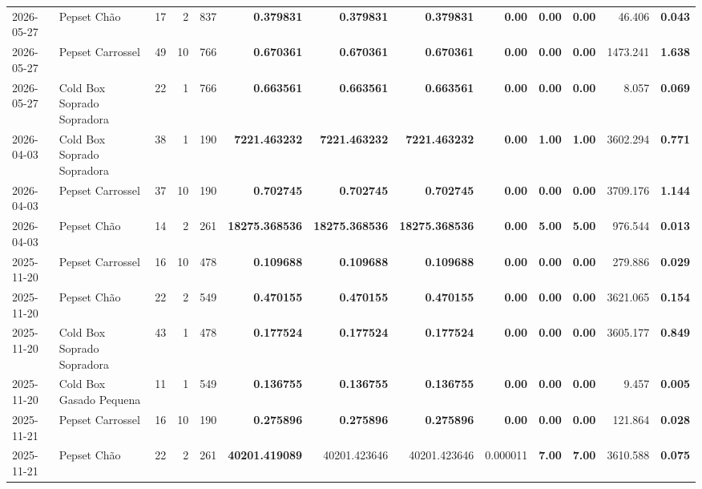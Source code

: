 {\begin{center}
{\begin{tabular}{@{}llrrrrrrrrrrr@{}}
2026-05-27 & Pepset Chão & 17 & 2 & 837 & \textbf{0.379831} & \textbf{0.379831} & \textbf{0.379831} & \textbf{0.00} & \textbf{0.00} & \textbf{0.00} & 46.406 & \textbf{0.043} \\
2026-05-27 & Pepset Carrossel & 49 & 10 & 766 & \textbf{0.670361} & \textbf{0.670361} & \textbf{0.670361} & \textbf{0.00} & \textbf{0.00} & \textbf{0.00} & 1473.241 & \textbf{1.638} \\
2026-05-27 & Cold Box Soprado Sopradora & 22 & 1 & 766 & \textbf{0.663561} & \textbf{0.663561} & \textbf{0.663561} & \textbf{0.00} & \textbf{0.00} & \textbf{0.00} & 8.057 & \textbf{0.069} \\
2026-04-03 & Cold Box Soprado Sopradora & 38 & 1 & 190 & \textbf{7221.463232} & \textbf{7221.463232} & \textbf{7221.463232} & \textbf{0.00} & \textbf{1.00} & \textbf{1.00} & 3602.294 & \textbf{0.771} \\
2026-04-03 & Pepset Carrossel & 37 & 10 & 190 & \textbf{0.702745} & \textbf{0.702745} & \textbf{0.702745} & \textbf{0.00} & \textbf{0.00} & \textbf{0.00} & 3709.176 & \textbf{1.144} \\
2026-04-03 & Pepset Chão & 14 & 2 & 261 & \textbf{18275.368536} & \textbf{18275.368536} & \textbf{18275.368536} & \textbf{0.00} & \textbf{5.00} & \textbf{5.00} & 976.544 & \textbf{0.013} \\
2025-11-20 & Pepset Carrossel & 16 & 10 & 478 & \textbf{0.109688} & \textbf{0.109688} & \textbf{0.109688} & \textbf{0.00} & \textbf{0.00} & \textbf{0.00} & 279.886 & \textbf{0.029} \\
2025-11-20 & Pepset Chão & 22 & 2 & 549 & \textbf{0.470155} & \textbf{0.470155} & \textbf{0.470155} & \textbf{0.00} & \textbf{0.00} & \textbf{0.00} & 3621.065 & \textbf{0.154} \\
2025-11-20 & Cold Box Soprado Sopradora & 43 & 1 & 478 & \textbf{0.177524} & \textbf{0.177524} & \textbf{0.177524} & \textbf{0.00} & \textbf{0.00} & \textbf{0.00} & 3605.177 & \textbf{0.849} \\
2025-11-20 & Cold Box Gasado Pequena & 11 & 1 & 549 & \textbf{0.136755} & \textbf{0.136755} & \textbf{0.136755} & \textbf{0.00} & \textbf{0.00} & \textbf{0.00} & 9.457 & \textbf{0.005} \\
2025-11-21 & Pepset Carrossel & 16 & 10 & 190 & \textbf{0.275896} & \textbf{0.275896} & \textbf{0.275896} & \textbf{0.00} & \textbf{0.00} & \textbf{0.00} & 121.864 & \textbf{0.028} \\
2025-11-21 & Pepset Chão & 22 & 2 & 261 & \textbf{40201.419089} & 40201.423646 & 40201.423646 & 0.000011 & \textbf{7.00} & \textbf{7.00} & 3610.588 & \textbf{0.075} \\

\end{tabular}}
\end{center}}
